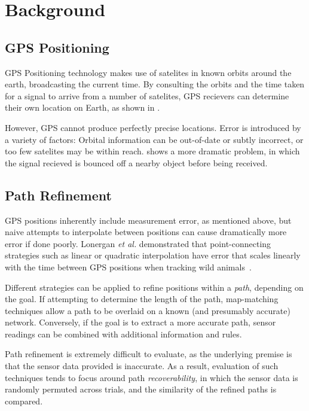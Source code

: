 \section{Background}

\subsection{GPS Positioning}


GPS Positioning technology makes use of satelites in known orbits around the earth, broadcasting the current time. By consulting the orbits and the time taken for a signal to arrive from a number of satelites, GPS recievers can determine their own location on Earth, as shown in .



However, GPS cannot produce perfectly precise locations. Error is introduced by a variety of factors: Orbital information can be out-of-date or subtly incorrect, or too few satelites may be within reach.  shows a more dramatic problem, in which the signal recieved is bounced off a nearby object before being received.

\subsection{Path Refinement}

GPS positions inherently include measurement error, as mentioned above, but naive attempts to interpolate between positions can cause dramatically more error if done poorly. Lonergan \textit{et al.} demonstrated that point-connecting strategies such as linear or quadratic interpolation have error that scales linearly with the time between GPS positions when tracking wild animals~\cite{lonergan09}.

Different strategies can be applied to refine positions within a \textit{path}, depending on the goal. If attempting to determine the length of the path, map-matching techniques allow a path to be overlaid on a known (and presumably accurate) network. Conversely, if the goal is to extract a more accurate path, sensor readings can be combined with additional information and rules.

Path refinement is extremely difficult to evaluate, as the underlying premise is that the sensor data provided is inaccurate. As a result, evaluation of such techniques tends to focus around path \textit{recoverability}, in which the sensor data is randomly permuted across trials, and the similarity of the refined paths is compared.
